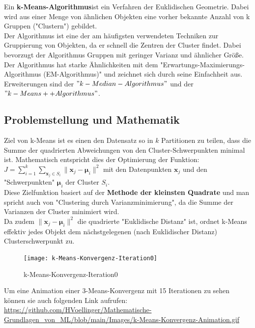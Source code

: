 \documentclass[12pt]{article}
\begin{document}
Ein \textbf{k-Means-Algorithmus}ist ein Verfahren der Euklidischen Geometrie. Dabei wird aus einer Menge von ähnlichen Objekten eine vorher bekannte Anzahl von k Gruppen ("Clustern") gebildet.\\
Der Algorithmus ist eine der am häufigsten verwendeten Techniken zur Gruppierung von Objekten, da er schnell die Zentren der Cluster findet. Dabei bevorzugt der Algorithmus Gruppen mit geringer Varianz und ähnlicher Größe.\\
Der Algorithmus hat starke Ähnlichkeiten mit dem "Erwartungs-Maximierungs-Algorithmus (EM-Algorithmus)" und zeichnet sich durch seine Einfachheit aus.\\
Erweiterungen sind der $"k-Median-Algorithmus"$ und der $"k-Means++ Algorithmus" $.\\

\subsection{Problemstellung und Mathematik}

Ziel von k-Means ist es einen den Datensatz so in $k$ Partitionen zu teilen, dass die Summe der quadrierten Abweichungen von den Cluster-Schwerpunkten minimal ist. Mathematisch entspricht dies der Optimierung der Funktion:\\[0.2cm]
$ J = \sum_{i=1}^{k}  \sum_{\mathbf x_j \in S_{i}} {\| \mathbf x_j - \boldsymbol \mu_i \|^2}$ mit den Datenpunkten $ \mathbf x_j $ und den "Schwerpunkten" $ \boldsymbol \mu_i $ der Cluster $ S_i$.\\[0.2cm]
Diese Zielfunktion basiert auf der \textbf{Methode der kleinsten Quadrate} und man spricht auch von "Clustering durch Varianzminimierung", da die Summe der Varianzen der Cluster minimiert wird.\\
Da zudem $ \| \mathbf x_j - \boldsymbol \mu_i \|^2 $ die quadrierte "Euklidische Distanz" ist, ordnet k-Means effektiv jedes Objekt dem nächstgelegenen (nach Euklidischer Distanz) Clusterschwerpunkt zu.\\ 

\newpage
%
\begin{figure}[htp]
  \centering
  \hspace*{-0.1cm} 
  \texttt{[image: k-Means-Konvergenz-Iteration0]}
  \caption{k-Means-Konvergenz-Iteration0}
  \label{fig:k-Means-Iteration0}
\end{figure}
%
Um eine Animation einer 3-Means-Konvergenz mit 15 Iterationen zu sehen können sie auch folgenden Link aufrufen:\\
\url{https://github.com/HVoellinger/Mathematische-Grundlagen_von_ML/blob/main/Images/k-Means-Konvergenz-Animation.gif}\\
\end{document}
